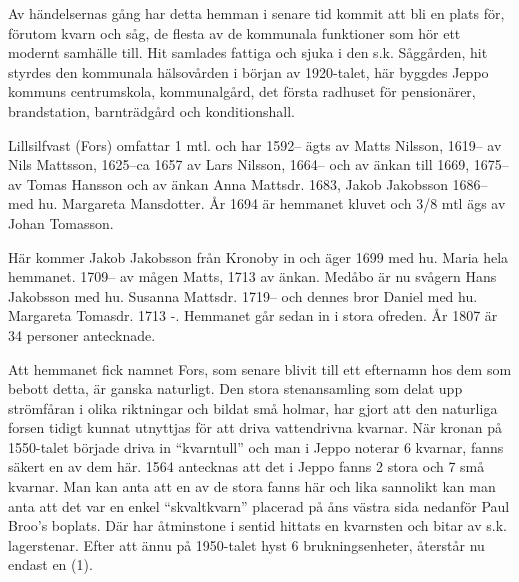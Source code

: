 Av händelsernas gång har detta hemman i senare tid kommit att bli en plats för, förutom kvarn och såg, de flesta av de kommunala funktioner som hör ett modernt samhälle till. Hit samlades fattiga och sjuka i den s.k. Såggården, hit styrdes den kommunala hälsovården i början av 1920-talet, här byggdes Jeppo kommuns centrumskola, kommunalgård, det första radhuset för pensionärer, brandstation, barnträdgård och konditionshall.

Lillsilfvast (Fors) omfattar 1 mtl. och har 1592-- ägts av Matts Nilsson, 1619-- av Nils Mattsson, 1625--ca 1657 av Lars Nilsson, 1664-- och av änkan till 1669, 1675-- av Tomas Hansson och av änkan Anna Mattsdr. 1683, Jakob Jakobsson 1686-- med hu. Margareta Mansdotter. År 1694 är hemmanet kluvet och 3/8 mtl ägs av Johan Tomasson.

Här kommer Jakob Jakobsson från Kronoby in och äger 1699 med hu. Maria hela hemmanet. 1709-- av mågen Matts, 1713 av änkan. Medåbo är nu svågern Hans Jakobsson med hu. Susanna Mattsdr. 1719-- och dennes bror Daniel med hu. Margareta Tomasdr. 1713  -. Hemmanet går sedan in i stora ofreden. År 1807 är 34 personer antecknade.

Att hemmanet fick namnet Fors, som senare blivit till ett efternamn hos dem som bebott detta, är ganska naturligt. Den stora stenansamling som delat upp strömfåran i olika riktningar och bildat små holmar, har gjort att den naturliga forsen tidigt kunnat utnyttjas för att driva vattendrivna kvarnar. När kronan på 1550-talet började driva in ``kvarntull'' och man i Jeppo noterar 6 kvarnar, fanns säkert en av dem här. 1564 antecknas att det i Jeppo fanns 2 stora och 7 små kvarnar. Man kan anta att en av de stora fanns här och lika sannolikt kan man anta att det var en enkel ``skvaltkvarn'' placerad på åns västra sida nedanför Paul Broo's boplats. Där har åtminstone i sentid hittats en kvarnsten och bitar av s.k. lagerstenar. Efter att ännu på 1950-talet hyst 6 brukningsenheter, återstår nu endast en (1).



